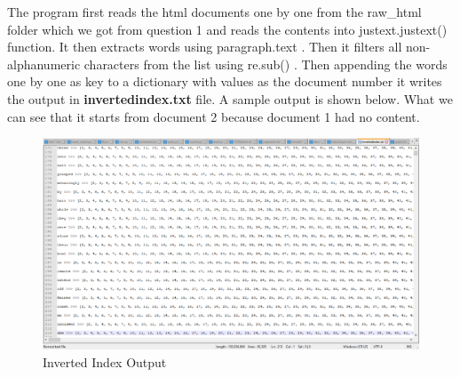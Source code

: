 \documentclass[letterpaper,11pt]{article}
\begin{document}
The program first reads the html documents one by one from the raw\_html folder which we got from question 1 and reads the contents into justext.justext() \cite{githubref} function. It then extracts words using paragraph.text \cite{githubref}. Then it filters all non-alphanumeric characters from the list using re.sub() \cite{regularref}. Then appending the words one by one as key to a dictionary with values as the document number it  writes the output in \textbf{invertedindex.txt} file. A sample output is shown below. What we can see that it starts from document 2 because document 1 had no content.


\begin{figure}[h]
\centering
\includegraphics[scale=0.3]{Index.png}
\caption{Inverted Index Output}
\label{fig:q7emojis}
\end{figure}


\clearpage
\end{document}
